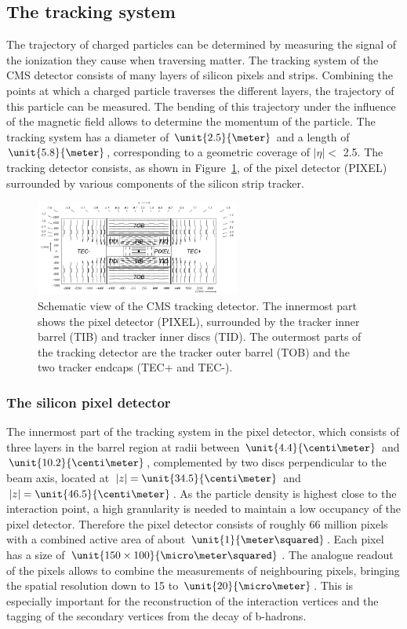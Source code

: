 \subsection{The tracking system}
The trajectory of charged particles can be determined by measuring the signal of the ionization they cause when traversing matter. The tracking system of the CMS detector consists of many layers of silicon pixels and strips. Combining the points at which a charged particle traverses the different layers, the trajectory of this particle can be measured. The bending of this trajectory under the influence of the magnetic field allows to determine the momentum of the particle. The tracking system has a diameter of $\unit{2.5}{\meter}$ and a length of $\unit{5.8}{\meter}$, corresponding to a geometric coverage of $\vert \eta \vert < $ 2.5. The tracking detector consists, as shown in Figure~\ref{fig:tracker}, of the pixel detector (PIXEL) surrounded by various components of  the silicon strip tracker. 
\begin{figure}[htbp]
\centering
  \includegraphics[width=0.6\textwidth]{plots/CMS/Tracker.png}
\caption{Schematic view of the CMS tracking detector. The innermost part shows the pixel detector (PIXEL), surrounded by the tracker inner barrel (TIB) and tracker inner discs (TID). The outermost parts of the tracking detector are the tracker outer barrel (TOB) and the two tracker endcaps (TEC+ and TEC-).}
\label{fig:tracker}
\end{figure} 
\subsubsection*{The silicon pixel detector}
The innermost part of the tracking system in the pixel detector, which consists of three layers in the barrel region at radii between $\unit{4.4}{\centi\meter}$ and $\unit{10.2}{\centi\meter}$, complemented by two discs perpendicular to the beam axis, located at $\vert z \vert = \unit{34.5}{\centi\meter}$ and  $\vert z \vert = \unit{46.5}{\centi\meter}$. As the particle density is highest close to the interaction point, a high granularity is needed to maintain a low occupancy of the pixel detector. Therefore the pixel detector consists of roughly 66 million pixels with a combined active area of about $\unit{1}{\meter\squared}$. Each pixel has a size of $\unit{150\times100}{\micro\meter\squared}$. The analogue readout of the pixels allows to combine the measurements of neighbouring pixels, bringing the spatial resolution down to 15 to $\unit{20}{\micro\meter}$. This is especially important for the reconstruction of the interaction vertices and the tagging of the secondary vertices from the decay of b-hadrons.
